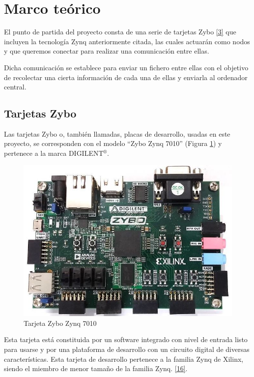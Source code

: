 \section{Marco teórico}
El punto de partida del proyecto consta de una serie de tarjetas Zybo \hyperlink{3}{[3]} que incluyen la tecnología Zynq anteriormente citada, las cuales actuarán como nodos y que queremos conectar para realizar una comunicación entre ellas.

Dicha comunicación se establece para enviar un fichero entre ellas con el objetivo de recolectar una cierta información de cada una de ellas y enviarla al ordenador central.

\subsection{Tarjetas Zybo}
Las tarjetas Zybo o, también llamadas, placas de desarrollo, usadas en este proyecto, se corresponden con el modelo ``Zybo Zynq 7010'' (Figura \ref{Tarjeta Zybo Zynq 7010}) y pertenece a la marca DIGILENT$^{\circledR}$.

\begin{figure}[h]
	\centering
	\includegraphics[scale=0.5]{Metodologia/MarcoTeorico/zybo.jpg}
	\caption{Tarjeta Zybo Zynq 7010}
	\label{Tarjeta Zybo Zynq 7010}
\end{figure}

Esta tarjeta está constituida por un software integrado con nivel de entrada listo para usarse y por una plataforma de desarrollo con un circuito digital de diversas características. Esta tarjeta de desarrollo pertenece a la familia Zynq de Xilinx, siendo el miembro de menor tamaño de la familia Zynq. \hyperlink{16}{[16]}.

